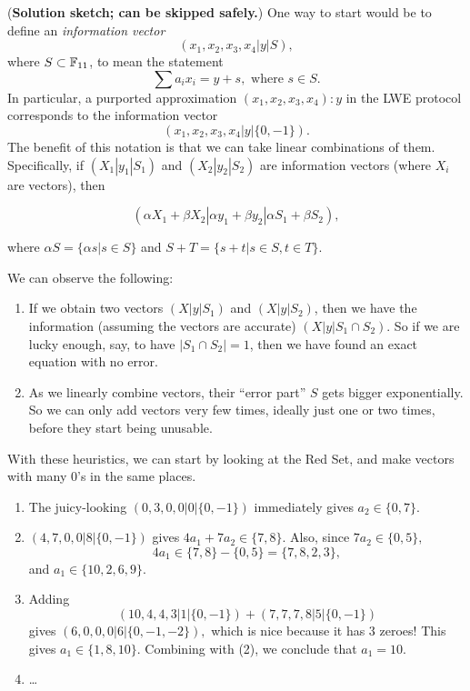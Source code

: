 (\textbf{Solution sketch; can be skipped safely.}) One way to start
would be to define an \emph{information vector}
\[( x_{1},x_{2},x_{3},x_{4}|y|S ),\] where
$S \subset \mathbb{F}_{11}$, to mean the statement
\[\sum a_{i}x_{i} = y + s,\text{ where }s \in S.\] In particular, a
purported approximation $( x_{1},x_{2},x_{3},x_{4} ):y$ in
the LWE protocol corresponds to the information vector
\[( x_{1},x_{2},x_{3},x_{4}|y|\{ 0, - 1 \} ).\]
The benefit of this notation is that we can take linear combinations of
them. Specifically, if $( X_{1}| y_{1} |S_{1} )$
and $( X_{2}| y_{2} |S_{2} )$ are information
vectors (where $X_{i}$ are vectors), then

\[( \alpha X_{1} + \beta X_{2}| \alpha y_{1} + \beta y_{2} |\alpha S_{1} + \beta S_{2} ),\]

where $\alpha S = \{ \alpha s|s \in S \}$ and
$S + T = \{ s + t|s \in S,t \in T \}$.

We can observe the following:

\begin{enumerate}
\item
  If we obtain two vectors $( X|y|S_{1} )$ and
  $( X|y|S_{2} )$, then we have the information (assuming
  the vectors are accurate) $( X|y|S_{1} \cap S_{2} )$. So
  if we are lucky enough, say, to have
  $| S_{1} \cap S_{2} | = 1$, then we have found an exact
  equation with no error.
\item
  As we linearly combine vectors, their ``error part'' $S$ gets bigger
  exponentially. So we can only add vectors very few times, ideally just
  one or two times, before they start being unusable.
\end{enumerate}

With these heuristics, we can start by looking at the Red Set, and make
vectors with many $0$'s in the same places.

\begin{enumerate}
\item
  The juicy-looking
  $( 0,3,0,0|0|\{ 0, - 1 \} )$
  immediately gives $a_{2} \in \{ 0,7 \}$.
\item
  $( 4,7,0,0|8|\{ 0, - 1 \} )$ gives
  $4a_{1} + 7a_{2} \in \{ 7,8 \}.$ Also, since
  $7a_{2} \in \{ 0,5 \},$
  \[4a_{1} \in \{ 7,8 \} - \{ 0,5 \} = \{ 7,8,2,3 \},\]
  and $a_{1} \in \{ 10,2,6,9 \}.$
\item
  Adding
  \[( 10,4,4,3|1|\{ 0, - 1 \} ) + ( 7,7,7,8|5|\{ 0, - 1 \} )\]
  gives $( 6,0,0,0|6|\{ 0, - 1, - 2 \} ),$ which
  is nice because it has 3 zeroes! This gives
  $a_{1} \in \{ 1,8,10 \}.$ Combining with (2), we conclude
  that $a_{1} = 10.$
\item
  \ldots{}
\end{enumerate}

